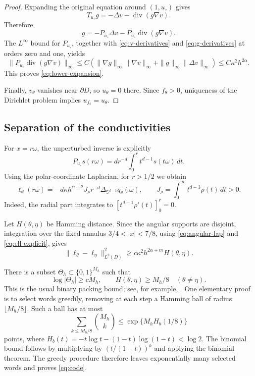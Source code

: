 \documentclass[11pt]{article}
\theoremstyle{remark}
\newcommand{\Sph}{\mathbb S^{d-1}}
\DeclareMathOperator{\divergence}{div}
\begin{document}
\begin{proof}
Expanding the original equation around \((1,u_\circ)\) gives
\[
T_{u_\circ}g=-\Delta v-\divergence(g\nabla v).
\]
Therefore
\[
g=-P_{u_\circ}\Delta v
  -P_{u_\circ}\divergence(g\nabla v).
\]
The \(L^\infty\) bound for \(P_{u_\circ}\), together with
\eqref{eq:v-derivatives} and \eqref{eq:g-derivatives} at orders
zero and one, yields
\[
\|P_{u_\circ}\divergence(g\nabla v)\|_\infty
\leq C\left(
\|\nabla g\|_\infty\|\nabla v\|_\infty
+\|g\|_\infty\|\Delta v\|_\infty
\right)
\leq C\kappa^2h^{2\alpha}.
\]
This proves \eqref{eq:lower-expansion}.

Finally, \(v_\theta\) vanishes near \(\partial D\), so
\(u_\theta=0\) there. Since \(f_\theta>0\), uniqueness of the
Dirichlet problem implies \(u_{f_\theta}=u_\theta\).
\end{proof}

\subsection{Separation of the conductivities}

For \(x=r\omega\), the unperturbed inverse is explicitly
\[
P_{u_\circ}s(r\omega)
=d r^{-d}\int_0^r t^{d-1}s(t\omega)\,dt.
\]
Using the polar-coordinate Laplacian, for \(r>1/2\) we obtain
\begin{equation}\label{eq:ell-explicit}
\ell_\theta(r\omega)=
-d\kappa h^{\alpha+2}J_\rho r^{-d}
\Delta_{\Sph}q_\theta(\omega),
\qquad
J_\rho=\int_0^\infty t^{d-3}\rho(t)\,dt>0.
\end{equation}
Indeed, the radial part integrates to
\([t^{d-1}\rho'(t)]_0^r=0\).

Let \(H(\theta,\eta)\) be Hamming distance. Since the angular
supports are disjoint, integration over the fixed annulus
\(3/4<|x|<7/8\), using \eqref{eq:angular-lap} and
\eqref{eq:ell-explicit}, gives
\begin{equation}\label{eq:linear-separation}
\|\ell_\theta-\ell_\eta\|_{L^2(D)}^2
\geq c\kappa^2 h^{2\alpha+m}H(\theta,\eta).
\end{equation}

There is a subset \(\Theta_h\subset\{0,1\}^{M_h}\) such that
\begin{equation}\label{eq:code}
\log|\Theta_h|\geq cM_h,\qquad
H(\theta,\eta)\geq M_h/8
\quad(\theta\neq\eta).
\end{equation}
This is the usual binary packing bound; see, for example,
\cite[Lemma~2.9]{Tsybakov}.
One elementary proof is to select words greedily, removing at each
step a Hamming ball of radius \(\lfloor M_h/8\rfloor\).
Such a ball has at most
\[
\sum_{k\leq M_h/8}\binom{M_h}{k}
\leq \exp\{M_h H_b(1/8)\}
\]
points, where \(H_b(t)=-t\log t-(1-t)\log(1-t)<\log2\).
The binomial bound follows by multiplying by
\((t/(1-t))^k\) and applying the binomial theorem.
The greedy procedure therefore leaves exponentially many selected
words and proves \eqref{eq:code}.
\end{document}
